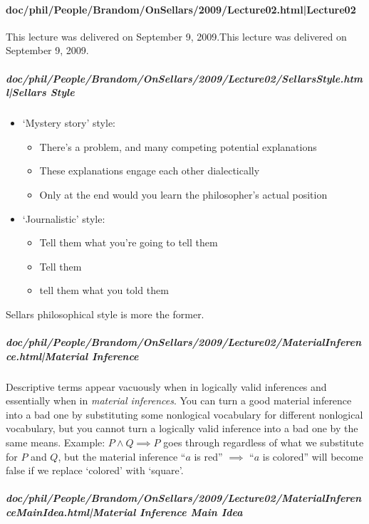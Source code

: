 \documentclass[12pt,a4paper]{report}
\begin{document}
\paragraph{doc/phil/People/Brandom/OnSellars/2009/Lecture02.html|Lecture02}
This lecture was delivered on September 9, 2009.This lecture was delivered on September 9, 2009.

\subparagraph{doc/phil/People/Brandom/OnSellars/2009/Lecture02/SellarsStyle.html|Sellars Style}

\begin{itemize}
\item `Mystery story' style:
    \begin{itemize}
        \item There's a problem, and many competing potential explanations
        \item These explanations engage each other dialectically
        \item Only at the end would you learn the philosopher's actual position
    \end{itemize}
\item `Journalistic' style:
    \begin{itemize}
        \item Tell them what you're going to tell them
        \item Tell them
        \item tell them what you told them
    \end{itemize}
\end{itemize}

Sellars philosophical style is more the former.
\subparagraph{doc/phil/People/Brandom/OnSellars/2009/Lecture02/MaterialInference.html|Material Inference}

Descriptive terms appear vacuously when in logically valid inferences and essentially when in \emph{material inferences}. You can turn a good material inference into a bad one by substituting some nonlogical vocabulary for different nonlogical vocabulary, but you cannot turn a logically valid inference into a bad one by the same means. Example: $P \land Q \implies P$ goes through regardless of what we substitute for $P$ and $Q$, but the material inference ``$a$ is red'' $\implies$ ``$a$ is colored'' will become false if we replace `colored' with `square'.

\subparagraph{doc/phil/People/Brandom/OnSellars/2009/Lecture02/MaterialInferenceMainIdea.html|Material Inference Main Idea}
\end{document}

